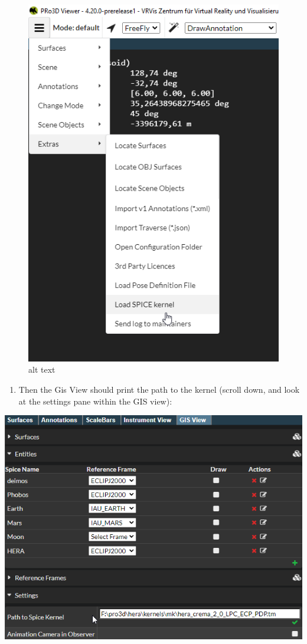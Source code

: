 \begin{figure}
\centering
\includegraphics{images/loadKernel.png}
\caption{alt text}
\end{figure}

\begin{enumerate}
\def\labelenumi{\arabic{enumi}.}
\setcounter{enumi}{2}
\tightlist
\item
  Then the Gis View should print the path to the kernel (scroll down,
  and look at the settings pane within the GIS view):
\end{enumerate}

\includegraphics{images/loadedKernel.png}

